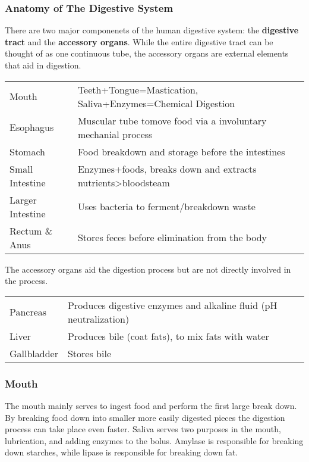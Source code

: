\documentclass[letterpaper, 11pt]{article}
\begin{document}
\subsubsection{Anatomy of The Digestive System}
\label{sec:org4d83f65}
There are two major componenets of the human digestive system: the \textbf{digestive tract} and the \textbf{accessory organs}. While the entire digestive tract can be thought of as one continuous tube, the accessory organs are external elements that aid in digestion.\\
\begin{center}
\begin{tabular}{ll}
Mouth & Teeth+Tongue=Mastication, Saliva+Enzymes=Chemical Digestion\\
Esophagus & Muscular tube tomove food via a involuntary mechanial process\\
Stomach & Food breakdown and storage before the intestines\\
Small Intestine & Enzymes+foods, breaks down and extracts nutrients>bloodsteam\\
Larger Intestine & Uses bacteria to ferment/breakdown waste\\
Rectum \& Anus & Stores feces before elimination from the body\\
\end{tabular}
\end{center}
The accessory organs aid the digestion process but are not directly involved in the process.\\
\begin{center}
\begin{tabular}{ll}
Pancreas & Produces digestive enzymes and alkaline fluid (pH neutralization)\\
Liver & Produces bile (coat fats), to mix fats with water\\
Gallbladder & Stores bile\\
\end{tabular}
\end{center}
\subsubsection{Mouth}
\label{sec:org461658b}
The mouth mainly serves to ingest food and perform the first large break down. By breaking food down into smaller more easily digested pieces the digestion process can take place even faster. Saliva serves two purposes in the mouth, lubrication, and adding enzymes to the bolus. Amylase is responsible for breaking down starches, while lipase is responsible for breaking down fat.\\
\end{document}
